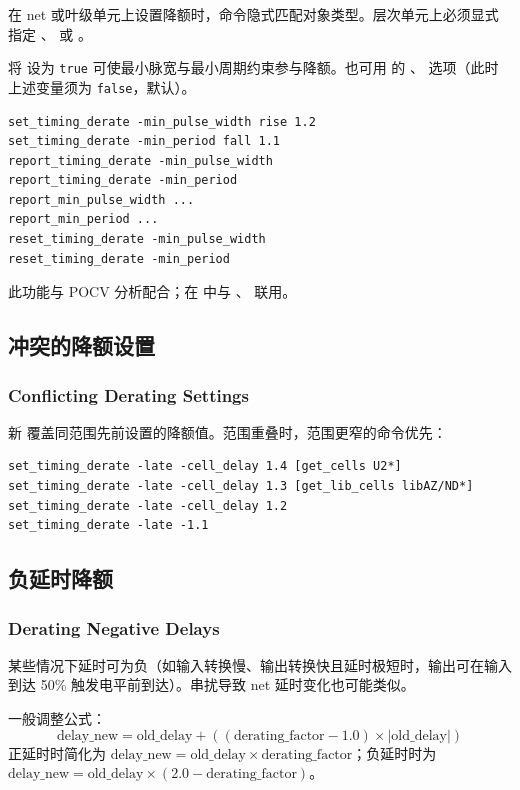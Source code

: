 在 net 或叶级单元上设置降额时，命令隐式匹配对象类型。层次单元上必须显式指定 、 或 。

将  设为 \texttt{true} 可使最小脉宽与最小周期约束参与降额。也可用  的 、 选项（此时上述变量须为 \texttt{false}，默认）。

\begin{lstlisting}
set_timing_derate -min_pulse_width rise 1.2
set_timing_derate -min_period fall 1.1
report_timing_derate -min_pulse_width
report_timing_derate -min_period
report_min_pulse_width ...
report_min_period ...
reset_timing_derate -min_pulse_width
reset_timing_derate -min_period
\end{lstlisting}

此功能与 POCV 分析配合；在  中与 、 联用。

\subsection{冲突的降额设置}
\subsubsection*{Conflicting Derating Settings}

新  覆盖同范围先前设置的降额值。范围重叠时，范围更窄的命令优先：
\begin{lstlisting}
set_timing_derate -late -cell_delay 1.4 [get_cells U2*]
set_timing_derate -late -cell_delay 1.3 [get_lib_cells libAZ/ND*]
set_timing_derate -late -cell_delay 1.2
set_timing_derate -late -1.1
\end{lstlisting}

\subsection{负延时降额}
\subsubsection*{Derating Negative Delays}

某些情况下延时可为负（如输入转换慢、输出转换快且延时极短时，输出可在输入到达 50\% 触发电平前到达）。串扰导致 net 延时变化也可能类似。

一般调整公式：
\[
\text{delay\_new} = \text{old\_delay} + ((\text{derating\_factor} - 1.0) \times |\text{old\_delay}|)
\]
正延时时简化为 $\text{delay\_new} = \text{old\_delay} \times \text{derating\_factor}$；负延时时为 $\text{delay\_new} = \text{old\_delay} \times (2.0 - \text{derating\_factor})$。

